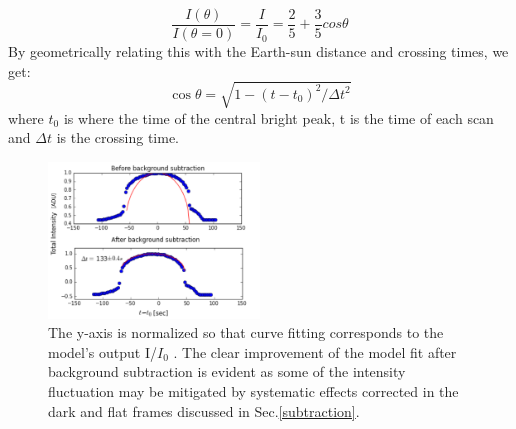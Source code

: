 \documentclass[authoryear, 12pt,5p, times]{elsarticle}
\begin{document}
\begin{equation}
\frac{I(\theta)}{I(\theta=0)}=\frac{I}{I_0}= \frac{2}{5}+\frac{3}{5}cos\theta
\label{eddington_eq}
\end{equation}
By geometrically relating this with the Earth-sun distance and crossing times, we get: 
\begin{equation}
\cos \theta = \sqrt{1-(t-t_0)^2/\Delta t^2} 
\end{equation}
where $t_0$ is where the time of the central bright peak, t is the time of each scan and $\Delta t$ is the crossing time.
\begin{figure}[h!]
\includegraphics[width=0.5\textwidth]{figures/eddington_fit}
\caption{ The y-axis is normalized so that curve fitting corresponds to the model's output I/$I_0$ . The clear improvement of the model fit after background subtraction is evident as some of the intensity fluctuation may be mitigated by systematic effects corrected in the dark and flat frames discussed in Sec.\ref{subtraction}.}
\label{eddington_fit}
\end{figure}
\end{document}
